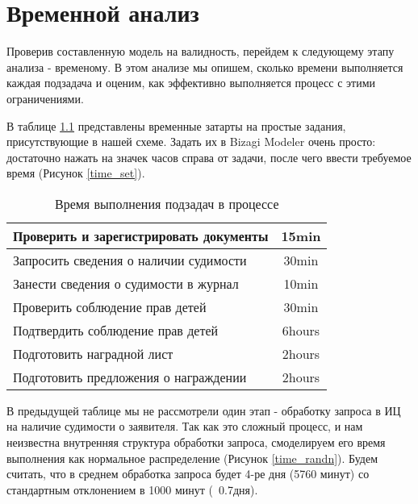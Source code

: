 \chapter{Временной анализ}

Проверив составленную модель на валидность, перейдем
к следующему этапу анализа - временому. В этом анализе
мы опишем, сколько времени выполняется каждая подзадача
и оценим, как эффективно выполняется процесс с этими
ограничениями.

В таблице \ref{table:time} представлены временные затарты
на простые задания, присутствующие в нашей схеме. Задать их
в Bizagi Modeler очень просто: достаточно нажать на значек
часов справа от задачи, после чего ввести требуемое время
(Рисунок \ref{time_set}).

\begin{table}
    \begin{tabular}{|l|c|}
        \hline
        Проверить и зарегистрировать документы & 15min \\ \hline
        Запросить сведения о наличии судимости & 30min \\ \hline
        Занести сведения о судимости в журнал & 10min \\ \hline
        Проверить соблюдение прав детей & 30min \\ \hline
        Подтвердить соблюдение прав детей & 6hours \\ \hline
        Подготовить наградной лист & 2hours \\ \hline
        Подготовить предложения о награждении & 2hours \\ \hline
    \end{tabular}
    \caption{Время выполнения подзадач в процессе}
    \label{table:time}
\end{table}

\clearpage


В предыдущей таблице мы не рассмотрели один этап -
обработку запроса в ИЦ на наличие судимости о заявителя.
Так как это сложный процесс, и нам неизвестна внутренняя
структура обработки запроса, смоделируем его время выполнения
как нормальное распределение (Рисунок \ref{time_randn}).
Будем считать, что в среднем обработка запроса будет
4-ре дня (5760 минут) со стандартным отклонением в 1000 минут
(~0.7дня).

